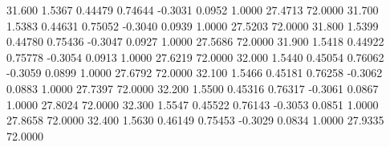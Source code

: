   31.600   1.5367   0.44479   0.74644  -0.3031   0.0952   1.0000  27.4713  72.0000
  31.700   1.5383   0.44631   0.75052  -0.3040   0.0939   1.0000  27.5203  72.0000
  31.800   1.5399   0.44780   0.75436  -0.3047   0.0927   1.0000  27.5686  72.0000
  31.900   1.5418   0.44922   0.75778  -0.3054   0.0913   1.0000  27.6219  72.0000
  32.000   1.5440   0.45054   0.76062  -0.3059   0.0899   1.0000  27.6792  72.0000
  32.100   1.5466   0.45181   0.76258  -0.3062   0.0883   1.0000  27.7397  72.0000
  32.200   1.5500   0.45316   0.76317  -0.3061   0.0867   1.0000  27.8024  72.0000
  32.300   1.5547   0.45522   0.76143  -0.3053   0.0851   1.0000  27.8658  72.0000
  32.400   1.5630   0.46149   0.75453  -0.3029   0.0834   1.0000  27.9335  72.0000

